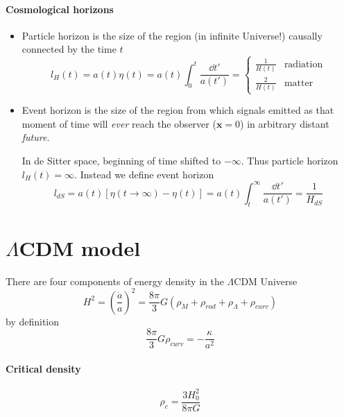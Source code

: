 \documentclass[12pt, a4paper, DIV=15]{article}
\numberwithin{equation}{section}
\begin{document}
\paragraph{Cosmological horizons}
\begin{itemize}
   \item Particle horizon is the size of the region (in infinite Universe!) causally connected by the time $t$
      \begin{equation}
         l_H(t) = a(t) \eta (t) = a(t) \int_0^t \frac{\dd{t'}}{a(t')} =
         \begin{cases}
            \frac{1}{H(t)} & \text{radiation} \\
            \frac{2}{H(t)} & \text{matter}
         \end{cases}
      \end{equation}
   \item Event horizon is the size of the region from which signals emitted as that moment of time will \textit{ever} reach the observer ($\pmb{x} = 0$) in arbitrary distant \textit{future}.

      In de Sitter space, beginning of time shifted to $-\infty$. Thus particle horizon $l_H(t) = \infty$. Instead we define event horizon
      \begin{equation}
         l_{dS} = a(t) \left[ \eta(t\rightarrow \infty) - \eta(t) \right]  = a(t) \int_t^\infty \frac{\dd{t'}}{a(t')} = \frac{1}{H_{dS}}
      \end{equation}
\end{itemize}

\section{$\Lambda$CDM model}
There are four components of energy density in the $\Lambda$CDM Universe
\begin{equation}
   H^2 = \left( \frac{\dot{a}}{a} \right)^2 = \frac{8\pi}{3} G \left( \rho_M + \rho_{rad} + \rho_\Lambda + \rho_{curv} \right)
\end{equation}
by definition
\begin{equation}
   \frac{8 \pi}{3} G \rho_{curv} = - \frac{\kappa}{a^2}
\end{equation}

\paragraph{Critical density} 
\begin{equation}
   \rho_c = \frac{3 H_0^2}{8\pi G}
\end{equation}
\end{document}
